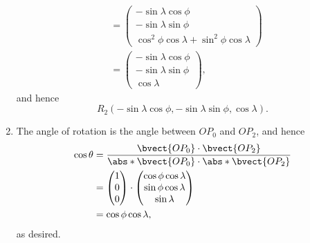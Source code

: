\begin{enumerate}
\begin{align*}
                             & = \begin{pmatrix}
                                     - \sin \lambda \cos \phi  \\
                                     -  \sin \lambda \sin \phi \\
                                     \cos^2 \phi \cos \lambda  + \sin^2 \phi \cos \lambda
                                 \end{pmatrix}                                                        \\
                             & = \begin{pmatrix}
                                     - \sin \lambda \cos \phi  \\
                                     -  \sin \lambda \sin \phi \\
                                     \cos \lambda
                                 \end{pmatrix},
          \end{align*}
          and hence
          \[
              R_2 (- \sin \lambda \cos \phi, - \sin \lambda \sin \phi, \cos \lambda).
          \]

    \item The angle of rotation is the angle between \(O P_0\) and \(O P_2\), and hence
          \begin{align*}
              \cos \theta & = \frac{\bvect{O P_0} \cdot \bvect{O P_2}}{\abs*{\bvect{O P_0}} \cdot \abs*{\bvect{O P_2}}} \\
                          & = \begin{pmatrix}
                                  1 \\
                                  0 \\
                                  0
                              \end{pmatrix} \cdot \begin{pmatrix}
                                                      \cos \phi \cos \lambda \\
                                                      \sin \phi \cos \lambda \\
                                                      \sin \lambda
                                                  \end{pmatrix}                                                \\
                          & = \cos \phi \cos \lambda,
          \end{align*}
          as desired.


\end{enumerate}

